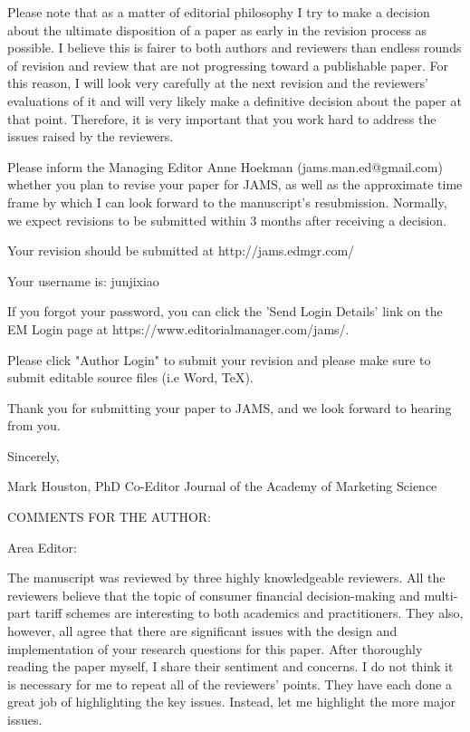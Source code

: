 Please note that as a matter of editorial philosophy I try to make a decision about the ultimate disposition of a paper as early in the revision process as possible. I believe this is fairer to both authors and reviewers than endless rounds of revision and review that are not progressing toward a publishable paper. For this reason, I will look very carefully at the next revision and the reviewers' evaluations of it and will very likely make a definitive decision about the paper at that point. Therefore, it is very important that you work hard to address the issues raised by the reviewers.

Please inform the Managing Editor Anne Hoekman (jams.man.ed@gmail.com) whether you plan to revise your paper for JAMS, as well as the approximate time frame by which I can look forward to the manuscript's resubmission.  Normally, we expect revisions to be submitted within 3 months after receiving a decision.

Your revision should be submitted at http://jams.edmgr.com/


Your username is: junjixiao

If you forgot your password, you can click the 'Send Login Details' link on the EM Login page at https://www.editorialmanager.com/jams/.

Please click "Author Login" to submit your revision and please make sure to submit editable source files (i.e Word, TeX).

Thank you for submitting your paper to JAMS, and we look forward to hearing from you.

Sincerely,  

Mark Houston, PhD
Co-Editor
Journal of the Academy of Marketing Science



COMMENTS FOR THE AUTHOR:




Area Editor:

The manuscript was reviewed by three highly knowledgeable reviewers. All the reviewers believe that the topic of consumer financial decision-making and multi-part tariff schemes are interesting to both academics and practitioners. They also, however, all agree that there are significant issues with the design and implementation of your research questions for this paper. After thoroughly reading the paper myself, I share their sentiment and concerns. I do not think it is necessary for me to repeat all of the reviewers’ points. They have each done a great job of highlighting the key issues. Instead, let me highlight the more major issues.

